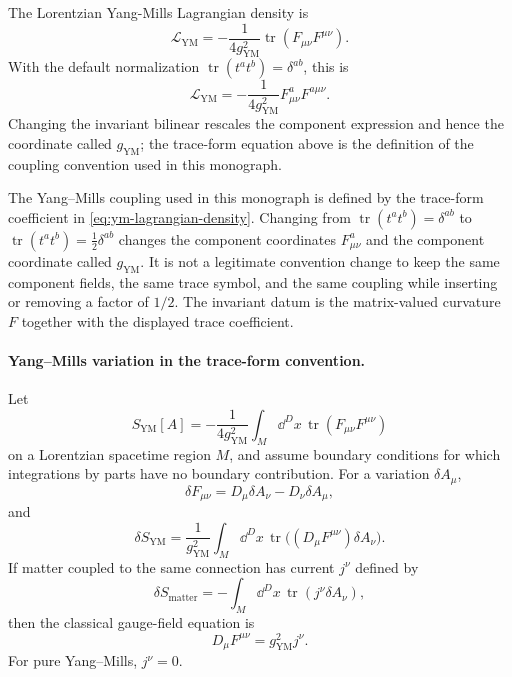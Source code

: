 The Lorentzian Yang-Mills Lagrangian density is
\begin{equation}
  \mathcal L_{\mathrm{YM}}
  =
  -\frac1{4g_{\mathrm{YM}}^2}
  \operatorname{tr}(F_{\mu\nu}F^{\mu\nu}).
  \label{eq:ym-lagrangian-density}
\end{equation}
With the default normalization \(\operatorname{tr}(t^a t^b)=\delta^{ab}\), this
is
\[
  \mathcal L_{\mathrm{YM}}
  =
  -\frac1{4g_{\mathrm{YM}}^2}F^a_{\mu\nu}F^{a\mu\nu}.
\]
Changing the invariant bilinear rescales the component expression and hence the
coordinate called \(g_{\mathrm{YM}}\); the trace-form equation above is the
definition of the coupling convention used in this monograph.

\begin{warning}
The Yang--Mills coupling used in this monograph is defined by the trace-form
coefficient in \eqref{eq:ym-lagrangian-density}.  Changing from
\(\operatorname{tr}(t^at^b)=\delta^{ab}\) to
\(\operatorname{tr}(t^at^b)=\frac12\delta^{ab}\) changes the component
coordinates \(F^a_{\mu\nu}\) and the component coordinate called
\(g_{\mathrm{YM}}\).  It is not a legitimate convention change to keep the
same component fields, the same trace symbol, and the same coupling while
inserting or removing a factor of \(1/2\).  The invariant datum is the
matrix-valued curvature \(F\) together with the displayed trace coefficient.
\end{warning}

\paragraph{Yang--Mills variation in the trace-form convention.}
Let
\[
  S_{\mathrm{YM}}[A]
  =
  -\frac1{4g_{\mathrm{YM}}^2}
  \int_M\dd^Dx\,\operatorname{tr}(F_{\mu\nu}F^{\mu\nu})
\]
on a Lorentzian spacetime region \(M\), and assume boundary conditions for
which integrations by parts have no boundary contribution.  For a variation
\(\delta A_\mu\),
\begin{equation}
  \delta F_{\mu\nu}
  =
  D_\mu\delta A_\nu-D_\nu\delta A_\mu,
  \label{eq:ym-curvature-variation}
\end{equation}
and
\begin{equation}
  \delta S_{\mathrm{YM}}
  =
  \frac1{g_{\mathrm{YM}}^2}
  \int_M\dd^Dx\,
  \operatorname{tr}\bigl((D_\mu F^{\mu\nu})\delta A_\nu\bigr).
  \label{eq:ym-action-variation}
\end{equation}
If matter coupled to the same connection has current \(j^\nu\) defined by
\begin{equation}
  \delta S_{\mathrm{matter}}
  =
  -\int_M\dd^Dx\,\operatorname{tr}(j^\nu\delta A_\nu),
  \label{eq:ym-matter-current-definition}
\end{equation}
then the classical gauge-field equation is
\begin{equation}
  D_\mu F^{\mu\nu}
  =
  g_{\mathrm{YM}}^2 j^\nu .
  \label{eq:ym-euler-lagrange-with-current}
\end{equation}
For pure Yang--Mills, \(j^\nu=0\).

